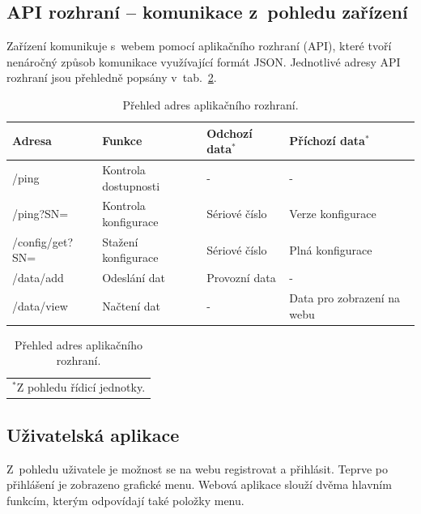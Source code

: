     \subsection{API rozhraní -- komunikace z~pohledu zařízení}
    Zařízení komunikuje s~webem pomocí aplikačního rozhraní (API), které tvoří nenáročný způsob komunikace využívající formát JSON. Jednotlivé adresy API rozhraní jsou přehledně popsány v~tab.~\ref{tab:prehled-api-adres}. 

    \begin{table}[h]
        \centering
        \caption{Přehled adres aplikačního rozhraní.}
        \label{tab:prehled-api-adres}
        \begin{tabular}{|l|l|l|l|}
            \hline
            Adresa & Funkce & Odchozí data\(^{*}\)  & Příchozí data\(^{*}\)  \\ \hline\hline
           
            /ping & Kontrola dostupnosti & - & -  \\ \hline
            /ping?SN= & Kontrola konfigurace & Sériové číslo & Verze konfigurace  \\ \hline
            /config/get?SN= & Stažení konfigurace & Sériové číslo & Plná konfigurace  \\ \hline
            /data/add & Odeslání dat & Provozní data & -  \\ \hline
            /data/view & Načtení dat & - & Data pro zobrazení na webu  \\ \hline
            \end{tabular}
            \begin{tabular}{c}
                \(^{*}\)Z pohledu  řídicí jednotky.
            \end{tabular}   
    \end{table}

    \subsection{Uživatelská aplikace}
        Z~pohledu uživatele je možnost se na webu registrovat a přihlásit. Teprve po přihlášení je zobrazeno grafické menu. Webová aplikace slouží dvěma hlavním funkcím, kterým odpovídají také položky menu. 
        
